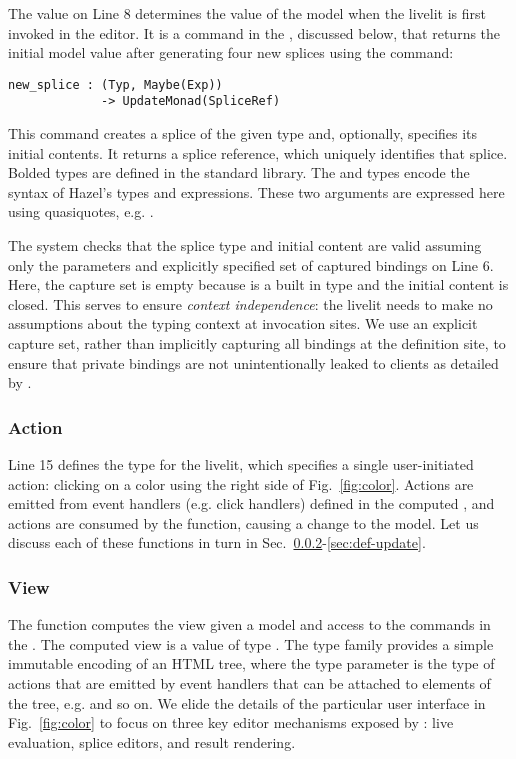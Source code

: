 The  value on Line 8 determines the value of the model
when the livelit is first invoked in the editor.
It is a command in the , discussed below, that returns the 
initial model value after generating four new splices 
using the  command:
\begin{lstlisting}[numbers=none]
new_splice : (Typ, Maybe(Exp)) 
             -> UpdateMonad(SpliceRef)
\end{lstlisting}
This command creates a splice
of the given type and, optionally, specifies its initial contents. 
It returns a splice reference, which uniquely identifies that splice.
Bolded types  
are defined in the standard library. The  and  types 
encode the syntax of Hazel's types and expressions.
These two arguments are expressed here using quasiquotes, e.g.  \cite{bawden1999quasiquotation}. 

The system checks that the splice type and initial content are valid 
assuming only the parameters and explicitly specified set of captured bindings on Line 6.
Here, the capture set is empty because  is a built in type
and the initial content is closed. 
This serves to ensure \emph{context independence}: the livelit needs to make no 
assumptions about the typing context at invocation sites.
We use an explicit capture set, rather than implicitly capturing all bindings 
at the definition site, 
to ensure that private bindings are not unintentionally  
leaked to clients as detailed by \citet{TLMs}.

\subsubsection{Action}
Line 15 defines the  type for the  livelit, which 
specifies a single user-initiated action: clicking on a color using
the right side of Fig.~\ref{fig:color}. Actions are emitted
from event handlers (e.g. click handlers) defined in the computed , 
and actions are consumed by the  function, causing a change to the model. 
Let us discuss each of these functions in turn in Sec.~\ref{sec:def-view}-\ref{sec:def-update}.

\subsubsection{View}\label{sec:def-view}
The  function computes the view given a model and access to the commands in 
the . The computed view is a value of type .  
The type family  provides a simple immutable
encoding of an HTML tree, where the type parameter  is the type of actions that 
are emitted by event handlers that can be attached to elements of the tree, e.g.
 and so on. 
We elide the details of the particular user interface in Fig.~\ref{fig:color}
to focus on three key editor mechanisms exposed by : live evaluation,
splice editors, and result rendering.

